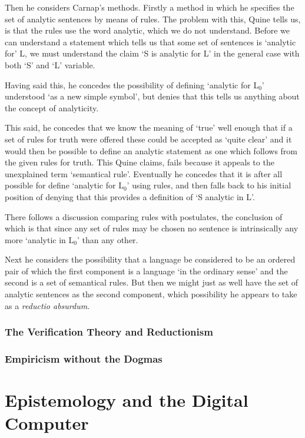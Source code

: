 Then he considers Carnap's methods.
Firstly a method in which he specifies the set of analytic sentences by means of rules.
The problem with this, Quine tells us, is that the rules use the word analytic, which we do not understand.
Before we can understand a statement which tells us that some set of sentences is `analytic for' L, we must understand the claim `S is analytic for L' in the general case with both `S' and `L' variable.

Having said this, he concedes the possibility of defining `analytic for L$_0$' understood `as a new simple symbol', but denies that this tells us anything about the concept of analyticity.

This said, he concedes that we know the meaning of `true' well enough that if a set of rules for truth were offered these could be accepted as `quite clear' and it would then be possible to define an analytic statement as one which follows from the given rules for truth.
This Quine claims, fails because it appeals to the unexplained term `semantical rule'.
Eventually he concedes that it is after all possible for define `analytic for L$_0$' using rules, and then falls back to his initial position of denying that this provides a definition of `S analytic in L'.

There follows a discussion comparing rules with postulates, the conclusion of which is that since any set of rules may be chosen no sentence is intrinsically any more `analytic in L$_0$' than any other.

Next he considers the possibility that a language be considered to be an ordered pair of which the first component is a language `in the ordinary sense' and the second is a set of semantical rules.
But then we might just as well have the set of analytic sentences as the second component, which possibility he appears to take as a \emph{reductio absurdum}.

\subsection{The Verification Theory and Reductionism}



\subsection{Empiricism without the Dogmas}

\chapter{Epistemology and the Digital Computer}

